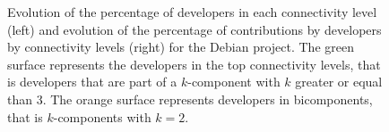 \begin{figure}[h]
{}
\hspace{.05in}

\caption[Debian: Evolution of connectivity levels and contributions.]{Evolution of the percentage of developers in each connectivity level (left) and evolution of the percentage of contributions by developers by connectivity levels (right) for the Debian project. The green surface represents the developers in the top connectivity levels, that is developers that are part of a $k$-component with $k$ greater or equal than 3. The orange surface represents developers in bicomponents, that is $k$-components with $k=2$.}
\label{fig:evo}
\end{figure}

